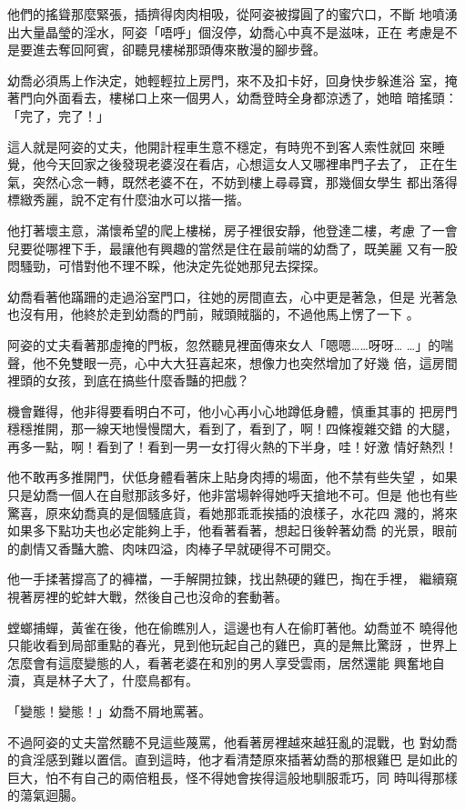他們的搖聳那麼緊張，插擠得肉肉相吸，從阿姿被撐圓了的蜜穴口，不斷
地噴湧出大量晶瑩的淫水，阿姿「唔呼」個沒停，幼喬心中真不是滋味，正在
考慮是不是要進去奪回阿賓，卻聽見樓梯那頭傳來散漫的腳步聲。

幼喬必須馬上作決定，她輕輕拉上房門，來不及扣卡好，回身快步躲進浴
室，掩著門向外面看去，樓梯口上來一個男人，幼喬登時全身都涼透了，她暗
暗搖頭：「完了，完了！」

這人就是阿姿的丈夫，他開計程車生意不穩定，有時兜不到客人索性就回
來睡覺，他今天回家之後發現老婆沒在看店，心想這女人又哪裡串門子去了，
正在生氣，突然心念一轉，既然老婆不在，不妨到樓上尋尋寶，那幾個女學生
都出落得標緻秀麗，說不定有什麼油水可以揩一揩。

他打著壞主意，滿懷希望的爬上樓梯，房子裡很安靜，他登達二樓，考慮
了一會兒要從哪裡下手，最讓他有興趣的當然是住在最前端的幼喬了，既美麗
又有一股悶騷勁，可惜對他不理不睬，他決定先從她那兒去探探。

幼喬看著他蹣跚的走過浴室門口，往她的房間直去，心中更是著急，但是
光著急也沒有用，他終於走到幼喬的門前，賊頭賊腦的，不過他馬上愣了一下
。

阿姿的丈夫看著那虛掩的門板，忽然聽見裡面傳來女人「嗯嗯……呀呀…
…」的喘聲，他不免雙眼一亮，心中大大狂喜起來，想像力也突然增加了好幾
倍，這房間裡頭的女孩，到底在搞些什麼香豔的把戲？

機會難得，他非得要看明白不可，他小心再小心地蹲低身體，慎重其事的
把房門穩穩推開，那一線天地慢慢闊大，看到了，看到了，啊！四條複雜交錯
的大腿，再多一點，啊！看到了！看到一男一女打得火熱的下半身，哇！好激
情好熱烈！

他不敢再多推開門，伏低身體看著床上貼身肉搏的場面，他不禁有些失望
，如果只是幼喬一個人在自慰那該多好，他非當場幹得她呼天搶地不可。但是
他也有些驚喜，原來幼喬真的是個騷底貨，看她那乖乖挨插的浪樣子，水花四
濺的，將來如果多下點功夫也必定能夠上手，他看著看著，想起日後幹著幼喬
的光景，眼前的劇情又香豔大膽、肉味四溢，肉棒子早就硬得不可開交。

他一手揉著撐高了的褲襠，一手解開拉鍊，找出熱硬的雞巴，掏在手裡，
繼續窺視著房裡的蛇蚌大戰，然後自己也沒命的套動著。

螳螂捕蟬，黃雀在後，他在偷瞧別人，這邊也有人在偷盯著他。幼喬並不
曉得他只能收看到局部重點的春光，見到他玩起自己的雞巴，真的是無比驚訝
，世界上怎麼會有這麼變態的人，看著老婆在和別的男人享受雲雨，居然還能
興奮地自瀆，真是林子大了，什麼鳥都有。

「變態！變態！」幼喬不屑地罵著。

不過阿姿的丈夫當然聽不見這些蔑罵，他看著房裡越來越狂亂的混戰，也
對幼喬的貪淫感到難以置信。直到這時，他才看清楚原來插著幼喬的那根雞巴
是如此的巨大，怕不有自己的兩倍粗長，怪不得她會挨得這般地馴服乖巧，同
時叫得那樣的蕩氣迴腸。

